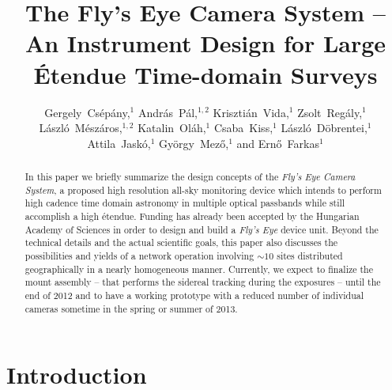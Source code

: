 
\resetcounters




\title{The Fly's Eye Camera System -- An Instrument Design for Large \'Etendue Time-domain Surveys}
\author{%
Gergely~Cs\'ep\'any,$^{1}$
Andr\'as~P\'al,$^{1,2}$
Kriszti\'an~Vida,$^{1}$
Zsolt~Reg\'aly,$^{1}$
L\'aszl\'o~M\'esz\'aros,$^{1,2}$
Katalin~Ol\'ah,$^{1}$
Csaba~Kiss,$^{1}$
L\'aszl\'o~D\"obrentei,$^{1}$
Attila~Jask\'o,$^{1}$
Gy\"orgy~Mez\H{o},$^{1}$ and
Ern\H{o}~Farkas$^{1}$
}


\begin{abstract}
In this paper we briefly summarize the design concepts of the {\it Fly's Eye Camera System}, a proposed high resolution all-sky monitoring device which intends to perform high cadence time domain astronomy in multiple optical passbands while still accomplish a high \'etendue. Funding has already been accepted by the Hungarian Academy of Sciences in order to design and build a {\it Fly's Eye} device unit. Beyond the technical details and the actual scientific goals, this paper also discusses the possibilities and yields of a network operation involving $\sim10$ sites distributed geographically in  a nearly homogeneous manner. Currently, we expect  to finalize the mount assembly -- that performs the sidereal tracking during the exposures -- until the end of 2012 and to have a working prototype with a reduced number of individual cameras sometime in the spring or summer of 2013.
\end{abstract}

\section{Introduction}

